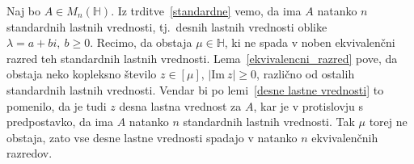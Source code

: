 \documentclass[mat1, tisk]{fmfdelo}
\numberwithin{equation}{section}
\begin{document}
\begin{dokaz}
    Naj bo $A \in M_n(\mathbb{H})$. Iz trditve~\ref{standardne} vemo, da ima $A$ natanko $n$ standardnih lastnih vrednosti, tj.\ desnih lastnih
    vrednosti oblike $\lambda = a + bi, \: b \geq 0$. Recimo, da obstaja $\mu \in \mathbb{H}$,
    ki ne spada v noben ekvivalenčni razred teh standardnih lastnih vrednosti. Lema~\ref{ekvivalencni_razred} pove, da obstaja neko kopleksno število
    $z \in [\mu], \, \lvert \mathrm{Im} \: z\rvert \geq 0$, različno od ostalih standardnih lastnih vrednosti. Vendar bi po lemi~\ref{desne lastne vrednosti} 
    to pomenilo, da je tudi $z$ desna lastna vrednost za $A$, kar je v protislovju s predpostavko, da ima $A$ natanko $n$ standardnih lastnih vrednosti.
    Tak $\mu$ torej ne obstaja, zato vse desne lastne vrednosti spadajo v natanko $n$ ekvivalenčnih razredov.
\end{dokaz}

\printbibliography
\end{document}
